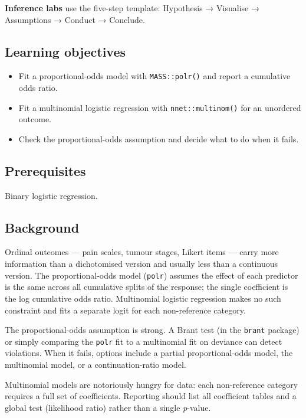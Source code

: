 \documentclass[
]{article}
\author{}
\date{\vspace{-2.5em}}
\providecommand{\tightlist}{%
  \setlength{\itemsep}{0pt}\setlength{\parskip}{0pt}}
\begin{document}
\textbf{Inference labs} use the five-step template: Hypothesis →
Visualise → Assumptions → Conduct → Conclude.

\subsection{Learning objectives}\label{learning-objectives}

\begin{itemize}
\tightlist
\item
  Fit a proportional-odds model with \texttt{MASS::polr()} and report a
  cumulative odds ratio.
\item
  Fit a multinomial logistic regression with \texttt{nnet::multinom()}
  for an unordered outcome.
\item
  Check the proportional-odds assumption and decide what to do when it
  fails.
\end{itemize}

\subsection{Prerequisites}\label{prerequisites}

Binary logistic regression.

\subsection{Background}\label{background}

Ordinal outcomes --- pain scales, tumour stages, Likert items --- carry
more information than a dichotomised version and usually less than a
continuous version. The proportional-odds model (\texttt{polr}) assumes
the effect of each predictor is the same across all cumulative splits of
the response; the single coefficient is the log cumulative odds ratio.
Multinomial logistic regression makes no such constraint and fits a
separate logit for each non-reference category.

The proportional-odds assumption is strong. A Brant test (in the
\texttt{brant} package) or simply comparing the \texttt{polr} fit to a
multinomial fit on deviance can detect violations. When it fails,
options include a partial proportional-odds model, the multinomial
model, or a continuation-ratio model.

Multinomial models are notoriously hungry for data: each non-reference
category requires a full set of coefficients. Reporting should list all
coefficient tables and a global test (likelihood ratio) rather than a
single \emph{p}-value.
\end{document}

